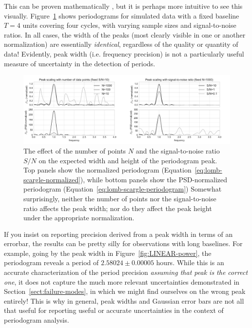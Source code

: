 \documentclass[preprint]{aastex}
\newcommand{\fig}[1]{Figure~\ref{fig:#1}}
\newcommand{\figlabel}[1]{\label{fig:#1}}
\newcommand{\Eq}[1]{Equation~\ref{eq:#1}}
\newcommand{\eq}[1]{\Eq{#1}}
\newcommand{\Sect}[1]{Section~\ref{sect:#1}}
\newcommand{\sect}[1]{\Sect{#1}}
\begin{document}
This can be proven mathematically \citep[see, e.g.][]{Bretthorst88, ICVG2014},
but it is perhaps more intuitive to see this visually.
\fig{peak-width-height} shows periodograms for simulated data with a fixed
baseline $T=4$ units covering four cycles, with varying sample sizes and
signal-to-noise ratios.
In all cases, the width of the peaks (most clearly visible in one or another
normalization) are essentially {\it identical}, regardless of the quality
or quantity of data!
Evidently, peak width ({i.e.} frequency precision) is not a particularly
useful measure of uncertainty in the detection of periods.

\begin{figure}[ht]
  \centering
  \includegraphics[width=\textwidth]{fig26_peak_width_height}
  \caption{The effect of the number of points $N$ and the signal-to-noise
    ratio $S/N$ on the expected width and height of the periodogram peak.
    Top panels show the normalized periodogram (\eq{lomb-scargle-normalized}),
    while bottom panels show the PSD-normalized periodogram
    (\eq{lomb-scargle-periodogram})
    Somewhat surprisingly, neither the number of points nor the signal-to-noise
    ratio affects the peak width; nor do they affect the peak height under
    the appropriate normalization.
    \figlabel{peak-width-height}}
\end{figure}

If you insist on reporting precision derived from a peak width
in terms of an errorbar, the results can be pretty silly for observations
with long baselines.
For example, going by the peak width in \fig{LINEAR-power}, the
periodogram reveals a period of $2.58024 \pm 0.00005$ hours.
While this is an accurate characterization of the period precision
{\it assuming that peak is the correct one}, it does not capture the
much more relevant uncertainties demonstrated in \sect{failure-modes},
in which we might find ourselves on the wrong peak entirely!
This is why in general, peak widths and Gaussian error bars are not all that
useful for reporting useful or accurate uncertainties in the context of
periodogram analysis.
\end{document}
